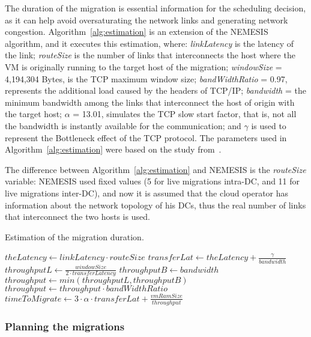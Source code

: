The duration of the migration is essential information for the scheduling decision, as it can help avoid oversaturating the network links and generating network congestion. Algorithm~\ref{alg:estimation} is an extension of the NEMESIS algorithm, and it executes this estimation, where: \textit{linkLatency} is the latency of the link; \textit{routeSize} is the number of links that interconnects the host where the VM is originally running to the target host of the migration; \mbox{\textit{windowSize}} = 4,194,304 Bytes, is the TCP maximum window size; \textit{bandWidthRatio} = 0.97, represents the additional load caused by the headers of TCP/IP; \textit{bandwidth} = the minimum bandwidth among the links that interconnect the host of origin with the target host; $\alpha$ = 13.01, simulates the TCP slow start factor, that is, not all the bandwidth is instantly available for the communication; and $\gamma$ is used to represent the Bottleneck effect of the TCP protocol. The parameters used in Algorithm~\ref{alg:estimation} were based on the study from~\citet{velho2013simgridparameters}. 

The difference between Algorithm~\ref{alg:estimation}  and NEMESIS is the \textit{routeSize} variable: NEMESIS used fixed values (5 for live migrations intra-DC, and 11 for live migrations inter-DC), and now it is assumed that the cloud operator has information about the network topology of his DCs, thus the real number of links that interconnect the two hosts is used.

\begin{algorithm}[h]
\begin{algorithmic}
\caption{Estimation of the migration duration.}\label{alg:estimation}
\State $theLatency \gets linkLatency \cdot routeSize$
\State $transferLat \gets theLatency + \frac{\gamma}{bandwidth}$
\State $throughputL \gets \frac{windowSize}{2 \cdot transferLatency}$
\State $throughputB \gets bandwidth$
\State $throughput \gets min(throughputL, throughputB)$
\State $throughput \gets throughput 
\cdot bandWidthRatio$
\State $timeToMigrate \gets  3 \cdot \alpha \cdot transferLat + \frac{vmRamSize}{throughput}$ 
\end{algorithmic}
\end{algorithm}

\subsubsection{Planning the migrations}
\label{sec:planning_migrations}


